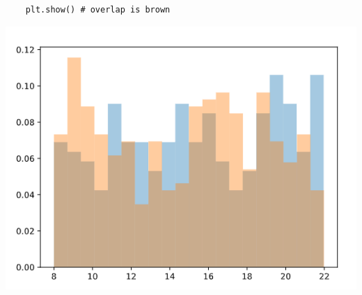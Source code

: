\documentclass[11pt, a4paper]{article}
\begin{document}
\begin{spacing}{1.1}
\begin{minipage}[c]{9cm}
\begin{lstlisting}
	plt.show() # overlap is brown \end{lstlisting}\vspace*{1mm}
	\end{minipage}
	\begin{minipage}[c]{9cm}
		\includegraphics[scale=.48]{multhist}
	\end{minipage} \newpage
	

\end{spacing}
\end{document}
